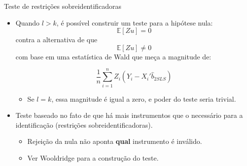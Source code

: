 \documentclass[11pt]{beamer}
\begin{document}
\begin{frame}{Teste de restrições sobreidentificadoras}
\begin{itemize}
	\item Quando $l > k$, é possível construir um teste para a hipótese nula:
	$$\mathbb{E}[Zu]=0$$
	contra a alternativa de que $$\mathbb{E}[Zu]\neq0$$ com base em uma estatística de Wald que meça a magnitude de:
	
		$$\frac{1}{n}\sum_{i=1}^n Z_i (Y_i - X_i'\hat{b}_{2SLS})$$
		\begin{itemize}
			\item Se $l = k$, essa magnitude é igual a zero, e poder do teste seria trivial.
		\end{itemize}
		\item Teste baseado no fato de que há mais instrumentos que o necessário para a identificação (restrições sobreidentificadoras).
		\begin{itemize}
			\item Rejeição da nula não aponta \textbf{qual} instrumento é inválido.
			\item Ver Wooldridge para a construção do teste.
		\end{itemize}
\end{itemize}
\end{frame}
\end{document}
